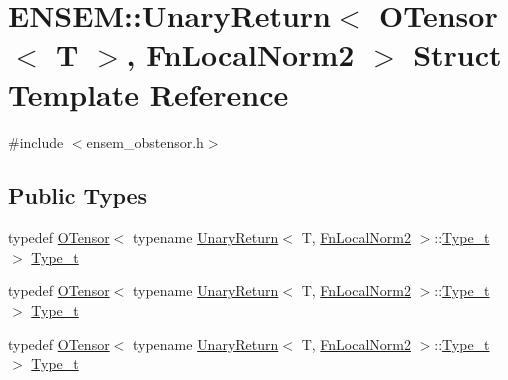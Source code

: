 \hypertarget{structENSEM_1_1UnaryReturn_3_01OTensor_3_01T_01_4_00_01FnLocalNorm2_01_4}{}\section{E\+N\+S\+EM\+:\+:Unary\+Return$<$ O\+Tensor$<$ T $>$, Fn\+Local\+Norm2 $>$ Struct Template Reference}
\label{structENSEM_1_1UnaryReturn_3_01OTensor_3_01T_01_4_00_01FnLocalNorm2_01_4}


{\ttfamily \#include $<$ensem\+\_\+obstensor.\+h$>$}

\subsection*{Public Types}
\begin{DoxyCompactItemize}
\item 
typedef \mbox{\hyperlink{classENSEM_1_1OTensor}{O\+Tensor}}$<$ typename \mbox{\hyperlink{structENSEM_1_1UnaryReturn}{Unary\+Return}}$<$ T, \mbox{\hyperlink{structENSEM_1_1FnLocalNorm2}{Fn\+Local\+Norm2}} $>$\+::\mbox{\hyperlink{structENSEM_1_1UnaryReturn_3_01OTensor_3_01T_01_4_00_01FnLocalNorm2_01_4_a6d6f8fdbc603bf32e2db2deaca0b82fa}{Type\+\_\+t}} $>$ \mbox{\hyperlink{structENSEM_1_1UnaryReturn_3_01OTensor_3_01T_01_4_00_01FnLocalNorm2_01_4_a6d6f8fdbc603bf32e2db2deaca0b82fa}{Type\+\_\+t}}
\item 
typedef \mbox{\hyperlink{classENSEM_1_1OTensor}{O\+Tensor}}$<$ typename \mbox{\hyperlink{structENSEM_1_1UnaryReturn}{Unary\+Return}}$<$ T, \mbox{\hyperlink{structENSEM_1_1FnLocalNorm2}{Fn\+Local\+Norm2}} $>$\+::\mbox{\hyperlink{structENSEM_1_1UnaryReturn_3_01OTensor_3_01T_01_4_00_01FnLocalNorm2_01_4_a6d6f8fdbc603bf32e2db2deaca0b82fa}{Type\+\_\+t}} $>$ \mbox{\hyperlink{structENSEM_1_1UnaryReturn_3_01OTensor_3_01T_01_4_00_01FnLocalNorm2_01_4_a6d6f8fdbc603bf32e2db2deaca0b82fa}{Type\+\_\+t}}
\item 
typedef \mbox{\hyperlink{classENSEM_1_1OTensor}{O\+Tensor}}$<$ typename \mbox{\hyperlink{structENSEM_1_1UnaryReturn}{Unary\+Return}}$<$ T, \mbox{\hyperlink{structENSEM_1_1FnLocalNorm2}{Fn\+Local\+Norm2}} $>$\+::\mbox{\hyperlink{structENSEM_1_1UnaryReturn_3_01OTensor_3_01T_01_4_00_01FnLocalNorm2_01_4_a6d6f8fdbc603bf32e2db2deaca0b82fa}{Type\+\_\+t}} $>$ \mbox{\hyperlink{structENSEM_1_1UnaryReturn_3_01OTensor_3_01T_01_4_00_01FnLocalNorm2_01_4_a6d6f8fdbc603bf32e2db2deaca0b82fa}{Type\+\_\+t}}
\end{DoxyCompactItemize}



